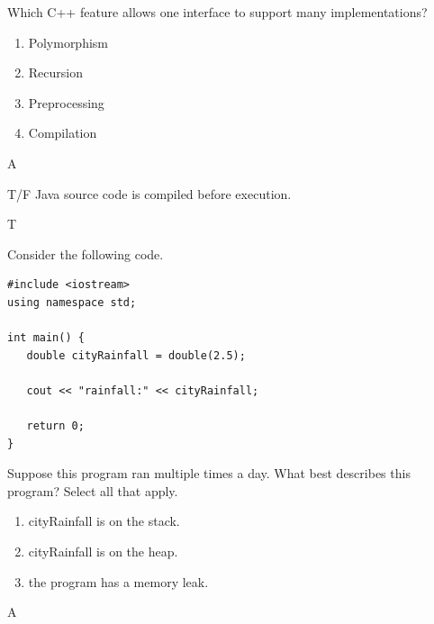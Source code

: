 
\item Which C++ feature allows one interface to support many implementations?
\begin{enumerate}[label=\Alph*.]
\item Polymorphism
\item Recursion
\item Preprocessing
\item Compilation
\end{enumerate}

\begin{solution}
    A
\end{solution}


\item 
T/F Java source code is compiled before execution. 

\begin{solution}
    T
\end{solution}


\item Consider the following code.

\begin{lstlisting}
#include <iostream>
using namespace std;

int main() {
   double cityRainfall = double(2.5);

   cout << "rainfall:" << cityRainfall;

   return 0;
}
\end{lstlisting}

Suppose this program ran multiple times a day.  What best describes this program?  Select all that apply.
\begin{enumerate}[label=\Alph*.]
\item cityRainfall is on the stack.
\item cityRainfall is on the heap.
\item the program has a memory leak.
\end{enumerate}

\begin{solution}
    A
\end{solution}


